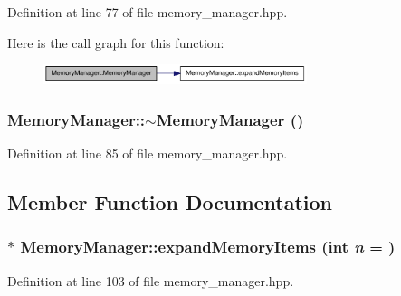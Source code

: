 Definition at line 77 of file memory\_\-manager.hpp.

Here is the call graph for this function:\nopagebreak
\begin{figure}[H]
\begin{center}
\leavevmode
\includegraphics[width=218pt]{class_memory_manager_a5b1191f93feb7d9e36ed3476b19ef3b1_cgraph}
\end{center}
\end{figure}
\hypertarget{class_memory_manager_ad4570910ccfc14b2da679bee58ee8f48}{
\subsubsection[{$\sim$MemoryManager}]{\setlength{\rightskip}{0pt plus 5cm}MemoryManager::$\sim$MemoryManager ()}}
\label{class_memory_manager_ad4570910ccfc14b2da679bee58ee8f48}


Definition at line 85 of file memory\_\-manager.hpp.

\subsection{Member Function Documentation}
\hypertarget{class_memory_manager_a672f7255418e01cccc234b563068c39e}{
\subsubsection[{expandMemoryItems}]{$\ast$ MemoryManager::expandMemoryItems (int {\em n} = {})}}
\label{class_memory_manager_a672f7255418e01cccc234b563068c39e}


Definition at line 103 of file memory\_\-manager.hpp.

